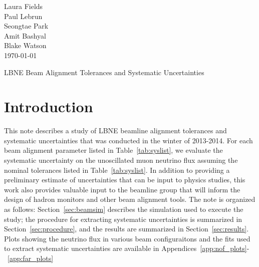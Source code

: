 



\begin{flushright}
Laura Fields\\
Paul Lebrun \\
Seongtae Park \\
Amit Bashyal \\
Blake Watson \\
\today
\end{flushright}

\begin{center}

{\LARGE LBNE Beam Alignment Tolerances and Systematic Uncertainties}
\end{center}



\section{Introduction}

This note describes a study of LBNE beamline alignment tolerances and systematic uncertainties that was conducted in the winter of 2013-2014.  For each beam alignment parameter listed in Table~\ref{tab:syslist}, we evaluate the systematic uncertainty on the unoscillated muon neutrino flux assuming the nominal tolerances listed in Table~\ref{tab:syslist}.  In addition to providing a preliminary estimate of uncertainties that can be input to physics studies, this work also provides valuable input to the beamline group that will inform the design of hadron monitors and other beam alignment tools.  The note is organized as follows: Section~\ref{sec:beamsim} describes the simulation used to execute the study; the procedure for extracting systematic uncertainties is summarized in Section~\ref{sec:procedure}, and the results are summarized in Section~\ref{sec:results}.  Plots showing the neutrino flux in various beam configuraitons and the fits used to extract systematic uncertainties are available in Appendices~\ref{app:nof_plots}-~\ref{app:far_plots}

